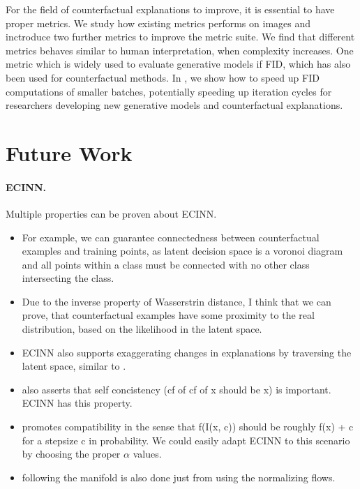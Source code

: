 \documentclass[11pt,a4paper,twoside,openright,final]{memoir}
\begin{document}
For the field of counterfactual explanations to improve, it is essential to have proper metrics.
We study how existing metrics performs on images and inctroduce two further metrics to improve the metric suite.
We find that different metrics behaves similar to human interpretation, when complexity increases.
One metric which is widely used to evaluate generative models if FID, which has also been used for counterfactual methods.
In \cite{fastfid}, we show how to speed up FID computations of smaller batches, potentially speeding up iteration cycles for researchers developing new generative models and counterfactual explanations.

\section{Future Work}
\paragraph{ECINN.}
Multiple properties can be proven about ECINN.
\begin{itemize}
    \item For example, we can guarantee connectedness between counterfactual examples and training points, as latent decision space is a voronoi diagram and all points within a class must be connected with no other class intersecting the class.
    \item Due to the inverse property of Wasserstrin distance, I think that we can prove, that counterfactual examples have some proximity to the real distribution, based on the likelihood in the latent space.
    \item ECINN also supports exaggerating changes in explanations by traversing the latent space, similar to \cite{Singla2019}. 
    \item \cite{Singla2019} also asserts that self concistency (cf of cf of x should be x) is important. ECINN has this property.
    \item \cite{Singla2019} promotes compatibility in the sense that f(I(x, c)) should be roughly f(x) + c for a stepsize c in probability. We could easily adapt ECINN to this scenario by choosing the proper $\alpha$ values.
    \item \cite{Singla2019} following the manifold is also done just from using the normalizing flows.
\end{itemize}
\end{document}
